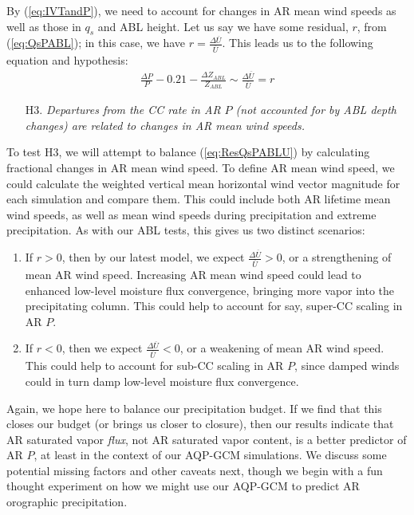 \documentclass[letterpaper,12pt]{article}
\begin{document}
By (\ref{eq:IVTandP}), we need to account for changes in AR mean wind speeds as well as those in $q_s$ and ABL height. Let us say we have some residual, $r$, from (\ref{eq:QsPABL}); in this case, we have  
$r = \frac{\Delta \overline{U}}{\overline{U}}$. This leads us to the following equation and hypothesis:
\begin{align}\label{eq:ResQsPABLU}
    \frac{\Delta P}{P} - 0.21 - \frac{\Delta Z_{ABL}}{Z_{ABL}} \sim \frac{\Delta \overline{U}}{\overline{U}} = r
\end{align}
\begin{itemize}
    \item[H3.] \textit{Departures from the CC rate in AR $P$ (not accounted for by ABL depth changes) are related to changes in AR mean wind speeds.}
\end{itemize}
To test H3, we will attempt to balance (\ref{eq:ResQsPABLU}) by calculating fractional changes in AR mean wind speed. To define AR mean wind speed, we could calculate the weighted vertical mean horizontal wind vector magnitude for each simulation and compare them. This could include both AR lifetime mean wind speeds, as well as mean wind speeds during precipitation and extreme precipitation. As with our ABL tests, this gives us two distinct scenarios: 
\begin{enumerate}
    \item If $r>0$, then by our latest model, we expect $\frac{\Delta \overline{U}}{\overline{U}} > 0$, or a strengthening of mean AR wind speed. Increasing AR mean wind speed could lead to enhanced low-level moisture flux convergence, bringing more vapor into the precipitating column. This could help to account for say, super-CC scaling in AR $P$. 
    \item If $r<0$, then we expect $\frac{\Delta \overline{U}}{\overline{U}} < 0$, or a weakening of mean AR wind speed. This could help to account for sub-CC scaling in AR $P$, since damped winds could in turn damp low-level moisture flux convergence.
\end{enumerate}
Again, we hope here to balance our precipitation budget. If we find that this closes our budget (or brings us closer to closure), then our results indicate that AR saturated vapor \textit{flux}, not AR saturated vapor content, is a better predictor of AR $P$, at least in the context of our AQP-GCM simulations. We discuss some potential missing factors and other caveats next, though we begin with a fun thought experiment on how we might use our AQP-GCM to predict AR orographic precipitation.  
\end{document}

